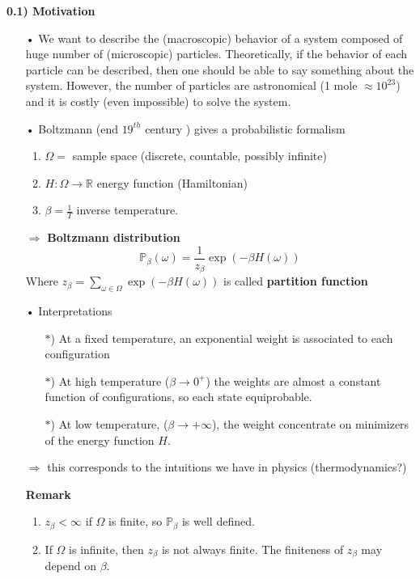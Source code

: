 \documentclass[12pt,a4paper]{article}
\begin{document}
\begin{flushleft}
	\Large \textbf{0.1) Motivation}
\end{flushleft}
\begin{enumerate}
    \item[•] We want to describe the (macroscopic) behavior of a system composed of huge number of (microscopic) particles. Theoretically, if the behavior of each particle can be described, then one should be able to say something about the system. However, the number of particles are astronomical (1 mole $\approx 10^{23}$) and it is costly (even impossible) to solve the system.
    \item[•] Boltzmann (end $19^{th}$ century ) gives a probabilistic formalism
    \begin{enumerate}
        \item $\Omega=$ sample space (discrete, countable, possibly infinite)
        \item $H:\Omega\to\mathbb{R}$ energy function (Hamiltonian) 
        \item $\beta=\frac{1}{T}$ inverse temperature.
    \end{enumerate}
    $\Rightarrow$ \textbf{Boltzmann distribution} 
    \[
    \mathbb{P}_{\beta}(\omega)=\frac{1}{z_\beta}\exp(-\beta H(\omega))
    \]
    Where $z_\beta=\sum\limits_{\omega\in\Omega}\exp(-\beta H(\omega))$ is called \textbf{partition function} 
    \item[•] Interpretations
    \begin{enumerate}
        \item[$*$)] At a fixed temperature, an exponential weight is associated to each configuration
        \item[$*$)] At high temperature ($\beta\to 0^+$) the weights are almost a constant function of configurations, so each state equiprobable.
        \item[$*$)] At low temperature, ($\beta\to +\infty$), the weight concentrate on minimizers of the energy function $H.$ 
    \end{enumerate}
    $\Rightarrow$ this corresponds to the intuitions we have in physics (thermodynamics?)
    \newpage
    \item[\textbf{Remark}] \begin{enumerate}
        \item $z_\beta<\infty$ if $\Omega$ is finite, so $\mathbb{P}_\beta$ is well defined.
        \item If $\Omega$ is infinite, then $z_\beta$ is not always finite. The finiteness of $z_\beta$ may depend on $\beta.$
    \end{enumerate}
\end{enumerate}
\end{document}
